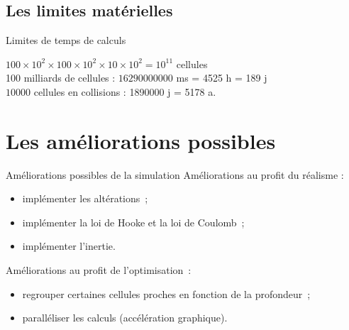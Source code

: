 \documentclass{beamer}
\begin{document}
\subsection{Les limites matérielles}
\begin{frame}{Limites de temps de calculs}
  \begin{center}
  \end{center}
  \begin{center}
  \end{center}
  $100 \times 10^2 \times 100 \times 10^2 \times 10 \times 10^2 = 10^{11}$ cellules \\
  100 milliards de cellules : $16290000000$ ms = 4525 h = 189 j\\
  $10000$ cellules en collisions : 1890000 j = 5178 a.
\end{frame}

\section{Les améliorations possibles}
\begin{frame}{Améliorations possibles de la simulation}
  Améliorations au profit du réalisme :
  \begin{itemize}
    \item implémenter les altérations~;
    \item implémenter la loi de Hooke et la loi de Coulomb~;
    \item implémenter l'inertie.
  \end{itemize}
  Améliorations au profit de l'optimisation~:
  \begin{itemize}
    \item regrouper certaines cellules proches en fonction de la profondeur~;
    \item paralléliser les calculs (accélération graphique).
  \end{itemize}
\end{frame}
\end{document}
